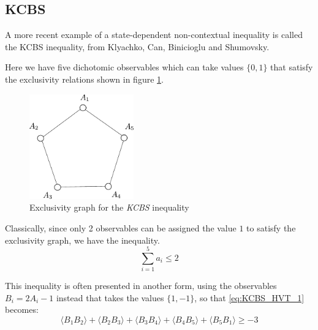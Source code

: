 \documentclass[a4paper]{article}
\newcommand{\acron}[1]{\textsc{#1}}
\theoremstyle{definition}
\begin{document}
\subsection{KCBS}
A more recent example of a state-dependent non-contextual inequality is
called the \acron{KCBS} inequality, from Klyachko, Can, Binicioglu and Shumovsky.

Here we have five dichotomic observables which can take values $\{0,1\}$ that satisfy the
exclusivity relations shown in figure \ref{fig:KCBS_graph}.
\begin{figure}[h]
        \centering
        \includegraphics[width=0.4\textwidth]{KCBSog.pdf}
        \caption{Exclusivity graph for the \emph{KCBS} inequality}
    \label{fig:KCBS_graph}
\end{figure}

Classically, since only 2 observables can be assigned the value
$1$ to satisfy the exclusivity graph, we have the inequality.
\begin{equation}
    \sum_{i=1}^5 a_i \le 2
    \label{eq:KCBS_HVT_1}
\end{equation}

This inequality is often presented in another form, using the
observables $B_i = 2 A_i - 1$ instead that takes the values $\{1,-1\}$, so that
\eqref{eq:KCBS_HVT_1} becomes:
\begin{equation}
    \langle{B_1B_2}\rangle + 
    \langle{B_2B_3}\rangle + 
    \langle{B_3B_4}\rangle + 
    \langle{B_4B_5}\rangle + 
    \langle{B_5B_1}\rangle \ge - 3 
    \label{eq:KCBS_HVT_2}
\end{equation}
\end{document}
